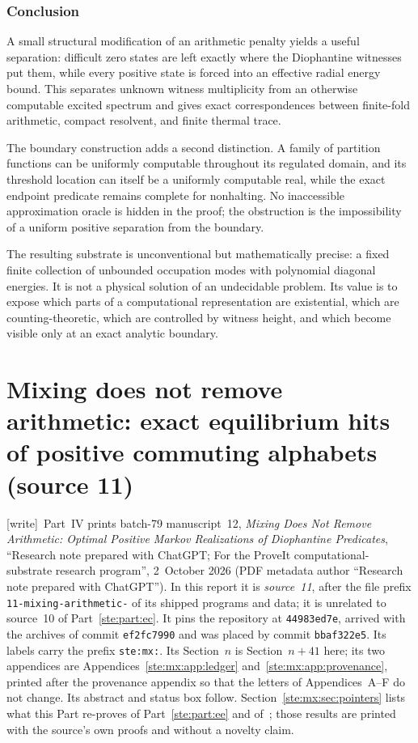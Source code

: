\documentclass[11pt,letterpaper]{article}
\theoremstyle{definition}
\theoremstyle{remark}
\newcommand{\wtag}{\textup{[write]}}
\begin{document}
\section{Conclusion}
A small structural modification of an arithmetic penalty yields a useful separation: difficult zero states are left exactly where the Diophantine witnesses put them, while every positive state is forced into an effective radial energy bound. This separates unknown witness multiplicity from an otherwise computable excited spectrum and gives exact correspondences between finite-fold arithmetic, compact resolvent, and finite thermal trace.

The boundary construction adds a second distinction. A family of partition functions can be uniformly computable throughout its regulated domain, and its threshold location can itself be a uniformly computable real, while the exact endpoint predicate remains complete for nonhalting. No inaccessible approximation oracle is hidden in the proof; the obstruction is the impossibility of a uniform positive separation from the boundary.

The resulting substrate is unconventional but mathematically precise: a fixed finite collection of unbounded occupation modes with polynomial diagonal energies. It is not a physical solution of an undecidable problem. Its value is to expose which parts of a computational representation are existential, which are counting-theoretic, which are controlled by witness height, and which become visible only at an exact analytic boundary.


\part{Mixing does not remove arithmetic: exact equilibrium hits of positive commuting alphabets (source 11)}\label{ste:part:mx}

\noindent\wtag\ Part~IV prints batch-79 manuscript~12, \emph{Mixing Does Not Remove Arithmetic: Optimal Positive Markov Realizations of Diophantine Predicates}, ``Research note prepared with ChatGPT; For the ProveIt computational-substrate research program'', 2~October 2026 (PDF metadata author ``Research note prepared with ChatGPT''). In this report it is \emph{source~11}, after the file prefix \texttt{11-mixing-arithmetic-} of its shipped programs and data; it is unrelated to source~10 of Part~\ref{ste:part:ec}. It pins the repository at \texttt{44983ed7e}, arrived with the archives of commit \texttt{ef2fc7990} and was placed by commit \texttt{bbaf322e5}. Its labels carry the prefix \texttt{ste:mx:}. Its Section~$n$ is Section~$n+41$ here; its two appendices are Appendices~\ref{ste:mx:app:ledger} and~\ref{ste:mx:app:provenance}, printed after the provenance appendix so that the letters of Appendices~A--F do not change. Its abstract and status box follow. Section~\ref{ste:mx:sec:pointers} lists what this Part re-proves of Part~\ref{ste:part:ee} and of~\cite{cdc}; those results are printed with the source's own proofs and without a novelty claim.
\end{document}
